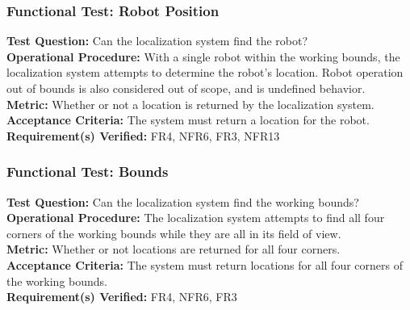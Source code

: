 \subsubsection{Functional Test: Robot Position}
\label{test:localization_ft_robopos}
\textbf{Test Question:} Can the localization system find the robot?\\
\textbf{Operational Procedure:} With a single robot within the working bounds, the localization system attempts to determine the robot's location. Robot operation out of bounds is also considered out of scope, and is undefined behavior.\\
\textbf{Metric:} Whether or not a location is returned by the localization system.\\
\textbf{Acceptance Criteria:} The system must return a location for the robot. \\
\textbf{Requirement(s) Verified:} FR4, NFR6, FR3, NFR13 \\

\subsubsection{Functional Test: Bounds}
\label{test:localization_ft_bounds}
\textbf{Test Question:} Can the localization system find the working bounds?\\
\textbf{Operational Procedure:} The localization system attempts to find all four corners of the working bounds while they are all in its field of view.\\
\textbf{Metric:} Whether or not locations are returned for all four corners.\\
\textbf{Acceptance Criteria:} The system must return locations for all four corners of the working bounds.\\
\textbf{Requirement(s) Verified:} FR4, NFR6, FR3 \\
